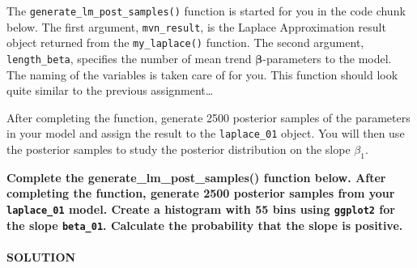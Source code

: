 \documentclass[
]{article}
\newenvironment{Shaded}{\begin{snugshade}}{\end{snugshade}}
\newcommand{\AttributeTok}[1]{\textcolor[rgb]{0.77,0.63,0.00}{#1}}
\newcommand{\ControlFlowTok}[1]{\textcolor[rgb]{0.13,0.29,0.53}{\textbf{#1}}}
\newcommand{\DecValTok}[1]{\textcolor[rgb]{0.00,0.00,0.81}{#1}}
\newcommand{\FunctionTok}[1]{\textcolor[rgb]{0.00,0.00,0.00}{#1}}
\newcommand{\NormalTok}[1]{#1}
\newcommand{\OtherTok}[1]{\textcolor[rgb]{0.56,0.35,0.01}{#1}}
\newcommand{\SpecialCharTok}[1]{\textcolor[rgb]{0.00,0.00,0.00}{#1}}
\newcommand{\StringTok}[1]{\textcolor[rgb]{0.31,0.60,0.02}{#1}}
\begin{document}
The \texttt{generate\_lm\_post\_samples()} function is started for you
in the code chunk below. The first argument, \texttt{mvn\_result}, is
the Laplace Approximation result object returned from the
\texttt{my\_laplace()} function. The second argument,
\texttt{length\_beta}, specifies the number of mean trend
\(\boldsymbol{\beta}\)-parameters to the model. The naming of the
variables is taken care of for you. This function should look quite
similar to the previous assignment\ldots{}

After completing the function, generate 2500 posterior samples of the
parameters in your model and assign the result to the
\texttt{laplace\_01} object. You will then use the posterior samples to
study the posterior distribution on the slope \(\beta_1\).

\textbf{Complete the generate\_lm\_post\_samples() function below. After
completing the function, generate 2500 posterior samples from your
\texttt{laplace\_01} model. Create a histogram with 55 bins using
\texttt{ggplot2} for the slope \texttt{beta\_01}. Calculate the
probability that the slope is positive.}

\hypertarget{solution-4}{%
\paragraph{SOLUTION}\label{solution-4}}

\begin{Shaded}
\end{Shaded}
\end{document}
